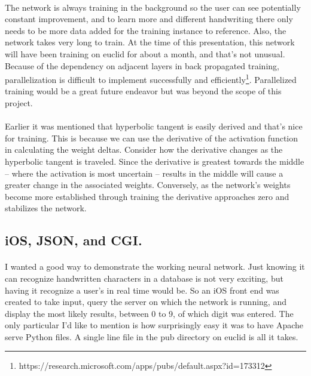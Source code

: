 \documentclass{article}
\begin{document}
    \paragraph{}The network is always training in the background so the user can 
    see potentially constant improvement, and to learn more and different 
    handwriting there only needs to be more data added for the training instance 
    to reference. Also, the network takes very long to train. At the time of this 
    presentation, this network will have been training on euclid for about a 
    month, and that's not unusual. Because of the dependency on 
    adjacent layers in back propagated training, parallelization is difficult to
    implement successfully and efficiently\footnote{
    https://research.microsoft.com/apps/pubs/default.aspx?id=173312}. Parallelized
    training would be a great future endeavor but was beyond the scope of this 
    project.

    \paragraph{}Earlier it was mentioned that hyperbolic tangent is easily derived
    and that's nice for training. This is because we can use the derivative of the 
    activation function in calculating the weight deltas. Consider how the 
    derivative changes as the hyperbolic tangent is traveled. Since the derivative 
    is greatest towards the middle -- where the activation is most uncertain -- 
    results in the middle will cause a greater change in the associated weights. 
    Conversely, as the network's weights become more established through training 
    the derivative approaches zero and stabilizes the network.

\subsection{iOS, JSON, and CGI.}

    \paragraph{}I wanted a good way to demonstrate the working neural network. Just
    knowing it can recognize handwritten characters in a database is not very 
    exciting, but having it recognize a user's in real time would be. So an iOS 
    front end was created to take input, query the server on which the network is 
    running, and display the most likely results, between 0 to 9, of which digit 
    was entered. The only particular I'd like to mention is how surprisingly easy 
    it was to have Apache serve Python files. A single line file in the pub 
    directory on euclid is all it takes. \\
\end{document}
